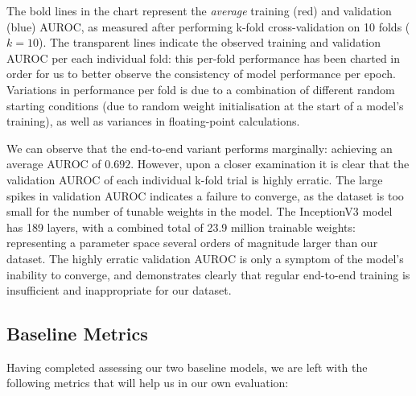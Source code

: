

\noindent
The bold lines in the chart represent the \emph{average} training (red) and validation (blue) AUROC, as measured after performing k-fold cross-validation on 10 folds (\(k = 10\)). The transparent lines indicate the observed training and validation AUROC per each individual fold: this per-fold performance has been charted in order for us to better observe the consistency of model performance per epoch. Variations in performance per fold is due to a combination of different random starting conditions (due to random weight initialisation at the start of a model's training), as well as variances in floating-point calculations.

We can observe that the end-to-end variant performs marginally: achieving an average AUROC of \(0.692\). However, upon a closer examination it is clear that the validation AUROC of each individual k-fold trial is highly erratic. The large spikes in validation AUROC indicates a failure to converge, as the dataset is too small for the number of tunable weights in the model. The InceptionV3 model has 189 layers, with a combined total of 23.9 million trainable weights: representing a parameter space several orders of magnitude larger than our dataset. The highly erratic validation AUROC is only a symptom of the model's inability to converge, and demonstrates clearly that regular end-to-end training is insufficient and inappropriate for our dataset.

\subsection{Baseline Metrics}\label{sec:baseline-implementation}

Having completed assessing our two baseline models, we are left with the following metrics that will help us in our own evaluation:



